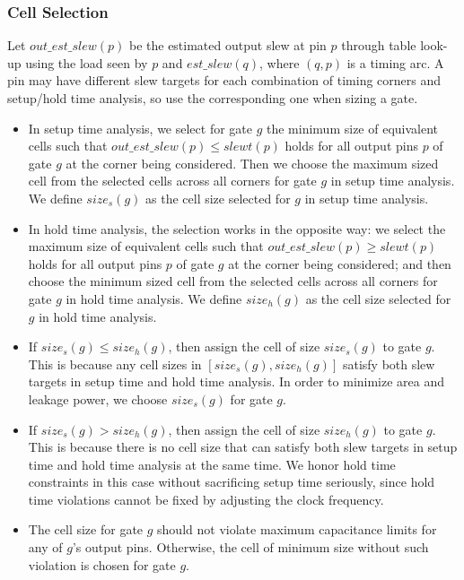\subsubsection{Cell Selection}

Let $out\_est\_slew(p)$ be the estimated output slew at pin $p$ through table look-up using the load seen by $p$ and $est\_slew(q)$, where $(q, p)$ is a timing arc. A pin may have different slew targets for each combination of timing corners and setup/hold time analysis, so use the corresponding one when sizing a gate.

\begin{itemize}
\item In setup time analysis, we select for gate $g$ the minimum size of equivalent cells such that $out\_est\_slew(p) \leq slewt(p)$ holds for all output pins $p$ of gate $g$ at the corner being considered. Then we choose the maximum sized cell from the selected cells across all corners for gate $g$ in setup time analysis. We define $size_{s}(g)$ as the cell size selected for $g$ in setup time analysis.

\item In hold time analysis, the selection works in the opposite way: we select the maximum size of equivalent cells such that $out\_est\_slew(p) \geq slewt(p)$ holds for all output pins $p$ of gate $g$ at the corner being considered; and then choose the minimum sized cell from the selected cells across all corners for gate $g$ in hold time analysis. We define $size_{h}(g)$ as the cell size selected for $g$ in hold time analysis.
    
\item If $size_{s}(g) \leq size_{h}(g)$, then assign the cell of size $size_{s}(g)$ to gate $g$. This is because any cell sizes in $[size_{s}(g), size_{h}(g)]$ satisfy both slew targets in setup time and hold time analysis. In order to minimize area and leakage power, we choose $size_{s}(g)$ for gate $g$.
    
\item If $size_{s}(g) > size_{h}(g)$, then assign the cell of size $size_{h}(g)$ to gate $g$. This is because there is no cell size that can satisfy both slew targets in setup time and hold time analysis at the same time. We honor hold time constraints in this case without sacrificing setup time seriously, since hold time violations cannot be fixed by adjusting the clock frequency.

\item The cell size for gate $g$ should not violate maximum capacitance limits for any of $g$'s output pins. Otherwise, the cell of minimum size without such violation is chosen for gate $g$.
\end{itemize}

